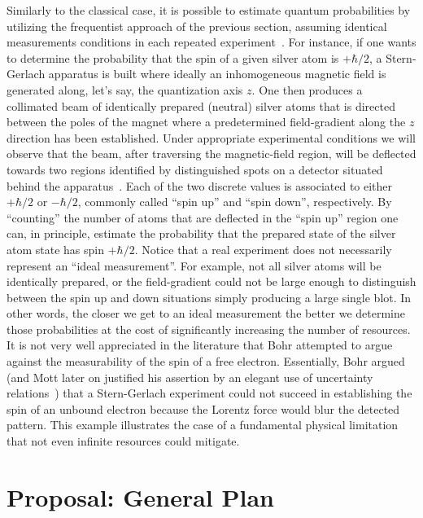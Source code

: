 \documentclass{article}
\theoremstyle{remark}
\begin{document}
Similarly to the classical case, it is possible to estimate quantum
probabilities by utilizing the frequentist approach of the previous
section, assuming identical measurements conditions in each repeated
experiment~\cite{peres1995quantum}. 
For instance, if one wants to determine the probability
that the spin of a given silver atom is $+\hbar/2$, a Stern-Gerlach
apparatus is built where ideally an inhomogeneous magnetic field is
generated along, let's say, the quantization axis $z$. One then
produces a collimated beam of identically prepared (neutral) silver
atoms that is directed between the poles of the magnet where a
predetermined field-gradient along the $z$ direction has been
established. Under appropriate experimental conditions we will observe
that the beam, after traversing the magnetic-field region, will be
deflected towards two regions identified by distinguished spots on a
detector situated behind the
apparatus~\cite{Stern1988,peres1995quantum,544199,Griffiths2003}.
Each of the two discrete values is associated to either $+\hbar/2$ or
$-\hbar/2$, commonly called ``spin up'' and ``spin down'',
respectively. By ``counting'' the number of atoms that are deflected
in the ``spin up'' region one can, in principle, estimate the
probability that the prepared state of the silver atom state has spin
$+\hbar/2$. Notice that a real experiment does not necessarily
represent an ``ideal measurement''. For example, not all silver atoms
will be identically prepared, or the field-gradient could not be large
enough to distinguish between the spin up and down situations simply
producing a large single blot. In other words, the closer we get to an
ideal measurement the better we determine those probabilities at the
cost of significantly increasing the number of resources. It is not
very well appreciated in the literature that Bohr attempted to argue
against the measurability of the spin of a free electron. Essentially,
Bohr argued (and Mott later on justified his assertion by an elegant
use of uncertainty relations~\cite{10.2307/j.ctt7ztxn5.15}) that a
Stern-Gerlach experiment could not succeed in establishing the spin of
an unbound electron because the Lorentz force would blur the detected
pattern. This example illustrates the case of a fundamental physical
limitation that not even infinite resources could mitigate.

\section{Proposal: General Plan} 
\end{document}

